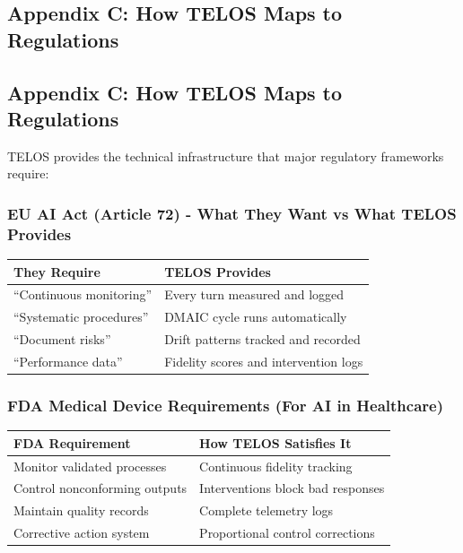 \subsection{Appendix C: How TELOS Maps to
Regulations}\label{appendix-c-how-telos-maps-to-regulations}

\subsection{Appendix C: How TELOS Maps to
Regulations}\label{appendix-c-how-telos-maps-to-regulations-1}

TELOS provides the technical infrastructure that major regulatory
frameworks require:

\subsubsection{EU AI Act (Article 72) - What They Want vs What TELOS
Provides}\label{eu-ai-act-article-72---what-they-want-vs-what-telos-provides}

{\def\LTcaptype{none} %
\begin{longtable}[]{@{}ll@{}}
\toprule\noalign{}
They Require & TELOS Provides \\
\midrule\noalign{}
\endhead
\bottomrule\noalign{}
\endlastfoot
``Continuous monitoring'' & Every turn measured and logged \\
``Systematic procedures'' & DMAIC cycle runs automatically \\
``Document risks'' & Drift patterns tracked and recorded \\
``Performance data'' & Fidelity scores and intervention logs \\
\end{longtable}
}

\subsubsection{FDA Medical Device Requirements (For AI in
Healthcare)}\label{fda-medical-device-requirements-for-ai-in-healthcare}

{\def\LTcaptype{none} %
\begin{longtable}[]{@{}ll@{}}
\toprule\noalign{}
FDA Requirement & How TELOS Satisfies It \\
\midrule\noalign{}
\endhead
\bottomrule\noalign{}
\endlastfoot
Monitor validated processes & Continuous fidelity tracking \\
Control nonconforming outputs & Interventions block bad responses \\
Maintain quality records & Complete telemetry logs \\
Corrective action system & Proportional control corrections \\
\end{longtable}
}

